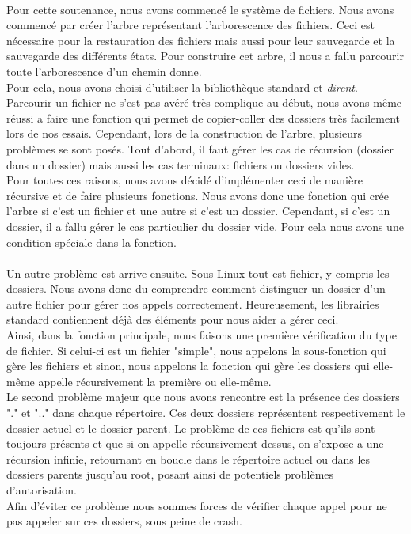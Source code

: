         \paragraph*{}
        Pour cette soutenance, nous avons commencé le système de fichiers. Nous avons commencé par créer l'arbre représentant l'arborescence des fichiers. Ceci est nécessaire pour la restauration des fichiers mais aussi pour leur sauvegarde et la sauvegarde des différents états. Pour construire cet arbre, il nous a fallu parcourir toute l'arborescence d'un chemin donne.\\
        Pour cela, nous avons choisi d'utiliser la bibliothèque standard et \textit{dirent}. Parcourir un fichier ne s'est pas avéré très complique au début, nous avons même réussi a faire une fonction qui permet de copier-coller des dossiers très facilement lors de nos essais. Cependant, lors de la construction de l'arbre, plusieurs problèmes se sont posés. Tout d'abord, il faut gérer les cas de récursion (dossier dans un dossier) mais aussi les cas terminaux: fichiers ou dossiers vides.\\
        Pour toutes ces raisons, nous avons décidé d'implémenter ceci de manière récursive et de faire plusieurs fonctions. Nous avons donc une fonction qui crée l'arbre si c'est un fichier et une autre si c'est un dossier. Cependant, si c'est un dossier, il a fallu gérer le cas particulier du dossier vide. Pour cela nous avons une condition spéciale dans la fonction.\\
        \paragraph*{}
        Un autre problème est arrive ensuite. Sous Linux tout est fichier, y compris les dossiers. Nous avons donc du comprendre comment distinguer un dossier d'un autre fichier pour gérer nos appels correctement. Heureusement, les librairies standard contiennent déjà des éléments pour nous aider a gérer ceci.\\
        Ainsi, dans la fonction principale, nous faisons une première vérification du type de fichier. Si celui-ci est un fichier "simple", nous appelons la sous-fonction qui gère les fichiers et sinon, nous appelons la fonction qui gère les dossiers qui elle-même appelle récursivement la première ou elle-même.\\
        Le second problème majeur que nous avons rencontre est la présence des dossiers "." et ".." dans chaque répertoire. Ces deux dossiers représentent respectivement le dossier actuel et le dossier parent. Le problème de ces fichiers est qu'ils sont toujours présents et que si on appelle récursivement dessus, on s'expose a une récursion infinie, retournant en boucle dans le répertoire actuel ou dans les dossiers parents jusqu'au root, posant ainsi de potentiels problèmes d'autorisation.\\
        Afin d'éviter ce problème nous sommes forces de vérifier chaque appel pour ne pas appeler sur ces dossiers, sous peine de crash.\\
        \newpage

